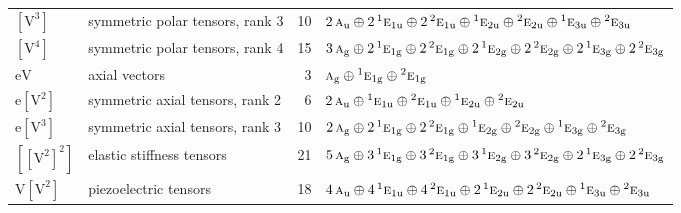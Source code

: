\documentclass[10pt,a4paper]{article}
\numberwithin{equation}{section}
\newcommand{\irr}[1]{\text{\normalfont\scshape #1}}
\newcommand{\conjpair}[1]{{}^{#1}}
\newcommand{\ptag}[1]{\mathrm{#1}}
\newcommand{\jahn}[1]{\mathrm{#1}}
\newlength{\fillwidth}\newlength{\cellwidth}\newlength{\colwidth}
\begin{document}
{\begin{longtable}{@{}llr>{\RaggedRight\arraybackslash}p{\fillwidth}@{}}
$\jahn{[V^{3}]}$ & symmetric polar tensors, rank 3 & 10 & $2\,\irr{a}_{\ptag{u}} \oplus\allowbreak 2\,\conjpair{1}\irr{e}_{1\ptag{u}} \oplus\allowbreak 2\,\conjpair{2}\irr{e}_{1\ptag{u}} \oplus\allowbreak \conjpair{1}\irr{e}_{2\ptag{u}} \oplus\allowbreak \conjpair{2}\irr{e}_{2\ptag{u}} \oplus\allowbreak \conjpair{1}\irr{e}_{3\ptag{u}} \oplus\allowbreak \conjpair{2}\irr{e}_{3\ptag{u}}$\\
$\jahn{[V^{4}]}$ & symmetric polar tensors, rank 4 & 15 & $3\,\irr{a}_{\ptag{g}} \oplus\allowbreak 2\,\conjpair{1}\irr{e}_{1\ptag{g}} \oplus\allowbreak 2\,\conjpair{2}\irr{e}_{1\ptag{g}} \oplus\allowbreak 2\,\conjpair{1}\irr{e}_{2\ptag{g}} \oplus\allowbreak 2\,\conjpair{2}\irr{e}_{2\ptag{g}} \oplus\allowbreak 2\,\conjpair{1}\irr{e}_{3\ptag{g}} \oplus\allowbreak 2\,\conjpair{2}\irr{e}_{3\ptag{g}}$\\
$\jahn{eV}$ & axial vectors & 3 & $\irr{a}_{\ptag{g}} \oplus\allowbreak \conjpair{1}\irr{e}_{1\ptag{g}} \oplus\allowbreak \conjpair{2}\irr{e}_{1\ptag{g}}$\\
$\jahn{e[V^{2}]}$ & symmetric axial tensors, rank 2 & 6 & $2\,\irr{a}_{\ptag{u}} \oplus\allowbreak \conjpair{1}\irr{e}_{1\ptag{u}} \oplus\allowbreak \conjpair{2}\irr{e}_{1\ptag{u}} \oplus\allowbreak \conjpair{1}\irr{e}_{2\ptag{u}} \oplus\allowbreak \conjpair{2}\irr{e}_{2\ptag{u}}$\\
$\jahn{e[V^{3}]}$ & symmetric axial tensors, rank 3 & 10 & $2\,\irr{a}_{\ptag{g}} \oplus\allowbreak 2\,\conjpair{1}\irr{e}_{1\ptag{g}} \oplus\allowbreak 2\,\conjpair{2}\irr{e}_{1\ptag{g}} \oplus\allowbreak \conjpair{1}\irr{e}_{2\ptag{g}} \oplus\allowbreak \conjpair{2}\irr{e}_{2\ptag{g}} \oplus\allowbreak \conjpair{1}\irr{e}_{3\ptag{g}} \oplus\allowbreak \conjpair{2}\irr{e}_{3\ptag{g}}$\\
$\jahn{[[V^{2}]^{2}]}$ & elastic stiffness tensors & 21 & $5\,\irr{a}_{\ptag{g}} \oplus\allowbreak 3\,\conjpair{1}\irr{e}_{1\ptag{g}} \oplus\allowbreak 3\,\conjpair{2}\irr{e}_{1\ptag{g}} \oplus\allowbreak 3\,\conjpair{1}\irr{e}_{2\ptag{g}} \oplus\allowbreak 3\,\conjpair{2}\irr{e}_{2\ptag{g}} \oplus\allowbreak 2\,\conjpair{1}\irr{e}_{3\ptag{g}} \oplus\allowbreak 2\,\conjpair{2}\irr{e}_{3\ptag{g}}$\\
$\jahn{V[V^{2}]}$ & piezoelectric tensors & 18 & $4\,\irr{a}_{\ptag{u}} \oplus\allowbreak 4\,\conjpair{1}\irr{e}_{1\ptag{u}} \oplus\allowbreak 4\,\conjpair{2}\irr{e}_{1\ptag{u}} \oplus\allowbreak 2\,\conjpair{1}\irr{e}_{2\ptag{u}} \oplus\allowbreak 2\,\conjpair{2}\irr{e}_{2\ptag{u}} \oplus\allowbreak \conjpair{1}\irr{e}_{3\ptag{u}} \oplus\allowbreak \conjpair{2}\irr{e}_{3\ptag{u}}$\\

\end{longtable}}
\end{document}

